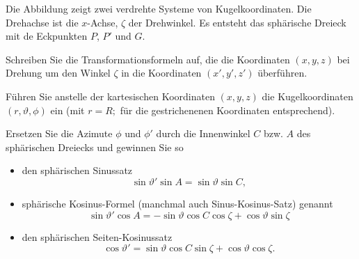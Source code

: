 \begin{atiTask}[
  title = Sphärische Trigonometrie
]


Die Abbildung zeigt zwei verdrehte Systeme von Kugelkoordinaten. Die Drehachse ist die $x$-Achse, $\zeta$ der Drehwinkel. Es entsteht das sphärische Dreieck mit de Eckpunkten $P$, $P'$ und $G$.

\begin{atiSubtasks}
\item Schreiben Sie die Transformationsformeln auf, die die Koordinaten $(x,y,z)$ bei Drehung um den Winkel $\zeta$ in die Koordinaten $(x',y',z')$ überführen.
\item Führen Sie anstelle der kartesischen Koordinaten $(x,y,z)$ die Kugelkoordinaten $(r,\vartheta,\phi)$ ein (mit $r=R;$ für die gestrichenenen Koordinaten entsprechend).
\item Ersetzen Sie die Azimute $\phi$ und $\phi'$ durch die Innenwinkel $C$ bzw. $A$ des sphärischen Dreiecks und gewinnen Sie so
\begin{itemize}
\item den sphärischen Sinussatz
\[
\sin\vartheta'\sin A=\sin \vartheta \sin C,
\]
\item sphärische Kosinus-Formel (manchmal auch Sinus-Kosinus-Satz) genannt
\[
\sin \vartheta'\cos A=-\sin \vartheta \cos C\cos \zeta+\cos \vartheta\sin \zeta
\]
\item den sphärischen Seiten-Kosinussatz
\[
\cos \vartheta'=\sin\vartheta \cos C\sin\zeta+\cos \vartheta\cos \zeta.
\]
\end{itemize}
\end{atiSubtasks}
\end{atiTask}

